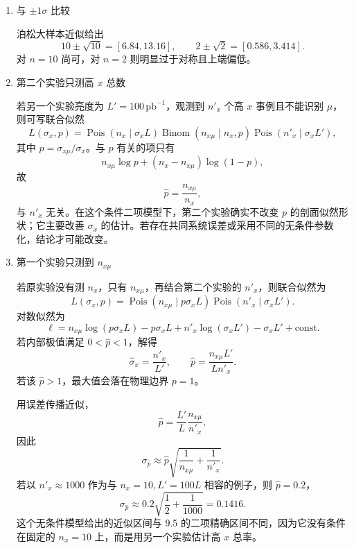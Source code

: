 \begin{question}
\begin{solution}
\begin{enumerate}
\item 与 \(\pm1\sigma\) 比较

泊松大样本近似给出
\[
10\pm\sqrt{10}=[6.84,13.16],
\qquad
2\pm\sqrt2=[0.586,3.414].
\]
对 \(n=10\) 尚可，对 \(n=2\) 则明显过于对称且上端偏低。

\item 第二个实验只测高 \(x\) 总数

若另一个实验亮度为 \(L'=100\,\mathrm{pb}^{-1}\)，观测到 \(n'_x\) 个高
\(x\) 事例且不能识别 \(\mu\)，则可写联合似然
\[
L(\sigma_x,p)=
\operatorname{Pois}(n_x\mid\sigma_xL)
\operatorname{Binom}(n_{x\mu}\mid n_x,p)
\operatorname{Pois}(n'_x\mid\sigma_xL'),
\]
其中 \(p=\sigma_{x\mu}/\sigma_x\)。与 \(p\) 有关的项只有
\[
n_{x\mu}\log p+(n_x-n_{x\mu})\log(1-p),
\]
故
\[
\hat p=\frac{n_{x\mu}}{n_x},
\]
与 \(n'_x\) 无关。在这个条件二项模型下，第二个实验确实不改变
\(p\) 的剖面似然形状；它主要改善 \(\sigma_x\) 的估计。若存在共同系统误差或采用不同的无条件参数化，结论才可能改变。

\item 第一个实验只测到 \(n_{x\mu}\)

若原实验没有测 \(n_x\)，只有 \(n_{x\mu}\)，再结合第二个实验的 \(n'_x\)，则联合似然为
\[
L(\sigma_x,p)=
\operatorname{Pois}(n_{x\mu}\mid p\sigma_xL)
\operatorname{Pois}(n'_x\mid\sigma_xL').
\]
对数似然为
\[
\ell=n_{x\mu}\log(p\sigma_xL)-p\sigma_xL
+n'_x\log(\sigma_xL')-\sigma_xL'+\text{const}.
\]
若内部极值满足 \(0<\hat p<1\)，解得
\[
\hat\sigma_x=\frac{n'_x}{L'},
\qquad
\hat p=\frac{n_{x\mu}L'}{Ln'_x}.
\]
若该 \(\hat p>1\)，最大值会落在物理边界 \(p=1\)。

用误差传播近似，
\[
\hat p=\frac{L'}{L}\frac{n_{x\mu}}{n'_x},
\]
因此
\[
\sigma_{\hat p}\approx
\hat p\sqrt{\frac1{n_{x\mu}}+\frac1{n'_x}}.
\]
若以 \(n'_x\approx1000\) 作为与 \(n_x=10,L'=100L\) 相容的例子，则
\(\hat p=0.2\)，
\[
\sigma_{\hat p}\approx0.2\sqrt{\frac12+\frac1{1000}}=0.1416.
\]
这个无条件模型给出的近似区间与 9.5 的二项精确区间不同，因为它没有条件在固定的
\(n_x=10\) 上，而是用另一个实验估计高 \(x\) 总率。
\end{enumerate}
\end{solution}
\end{question}


